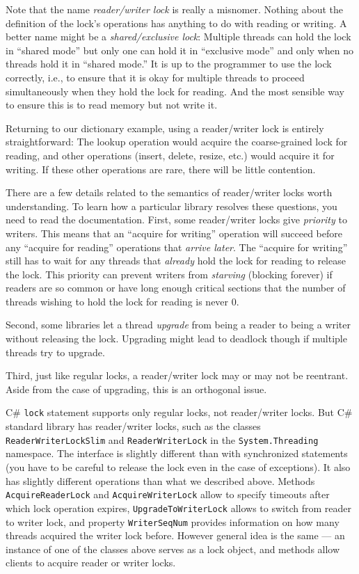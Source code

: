 \documentclass[10pt]{article}
\begin{document}
Note that the name \emph{reader/writer lock} is really a misnomer.
Nothing about the definition of the lock's operations has anything to
do with reading or writing.  A better name might be a
\emph{shared/exclusive lock}: Multiple threads can hold the lock in
``shared mode'' but only one can hold it in ``exclusive mode'' and
only when no threads hold it in ``shared mode.''  It is up to the
programmer to use the lock correctly, i.e., to ensure that it is okay
for multiple threads to proceed simultaneously when they hold the lock for
reading.  And the most sensible way to ensure this is to read memory
but not write it.

Returning to our dictionary example, using a reader/writer lock is
entirely straightforward: The lookup operation would acquire the
coarse-grained lock for reading, and other operations (insert, delete,
resize, etc.) would acquire it for writing.  If these other operations
are rare, there will be little contention.

There are a few details related to the semantics of reader/writer
locks worth understanding.  To learn how a particular library resolves these
questions, you need to read the documentation.  First, some
reader/writer locks give \emph{priority} to writers.  This means that
an ``acquire for writing'' operation will succeed before any ``acquire
for reading'' operations that \emph{arrive later}.  The ``acquire for
writing'' still has to wait for any threads that \emph{already} hold
the lock for reading to release the lock.  This priority can prevent
writers from \emph{starving} (blocking forever) if readers are so
common or have long enough critical sections that the number of
threads wishing to hold the lock for reading is never 0.

Second, some libraries let a thread \emph{upgrade} from being a reader
to being a writer without releasing the lock.  Upgrading might lead to
deadlock though if multiple threads try to upgrade.

Third, just like regular locks, a reader/writer lock may or may not
be reentrant.  Aside from the case of upgrading, this is an orthogonal
issue.

C\# {\tt lock} statement supports only regular locks, not
reader/writer locks.  But C\# standard library has reader/writer
locks, such as the classes {\tt ReaderWriterLockSlim} 
and {\tt ReaderWriterLock} in the {\tt System.Threading} namespace. 
The interface is slightly different than with synchronized statements 
(you have to be careful to release the lock even in the case of exceptions). 
It also has slightly different operations than what we described above.  Methods {\tt
  AcquireReaderLock} and {\tt AcquireWriterLock} allow to specify timeouts 
  after which lock operation expires, {\tt UpgradeToWriterLock} allows to 
  switch from reader to writer lock, and property {\tt WriterSeqNum} provides information 
  on how many threads acquired the writer lock before. However general idea is the same --- 
  an instance of one of the classes above serves as a lock object, 
  and methods allow clients to acquire reader or writer locks.
\end{document}
